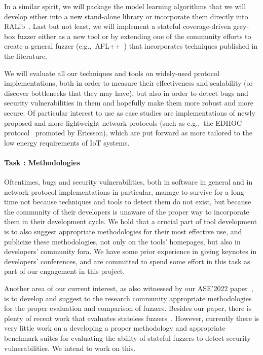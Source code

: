 \documentclass[11pt]{article}
\newcommand{\system}[1]{\mbox{\textsf{#1}}}
\newcounter{Task}
\newcommand{\task}[1]{\addtocounter{Task}{1}\paragraph{Task \theTask: #1}}
\newcommand{\significance}[1]{\vspace*{-0.5em}%
  \begin{quoting}\noindent\textbf{Significance:} #1\end{quoting}}
\newcommand{\myparagraph}{}
\let\myparagraph=\paragraph
\renewcommand{\paragraph}{\vspace{-3mm}\myparagraph}
\newcommand{\eg}{e.\/g.,\ }
\begin{document}
In a similar spirit, we will package the model learning algorithms that we
will develop either into a new stand-alone library or incorporate them
directly into \system{RALib}~\cite{CasselHJS16}.
%
Last but not least, we will implement a stateful coverage-driven grey-box
fuzzer either as a new tool or by extending one of the community efforts to
create a general fuzzer (\eg \system{AFL++}~\cite{AFL++@Woot-20}) that
incorporates techniques published in the literature.

We will evaluate all our techniques and tools on widely-used protocol
implementations, both in order to measure their effectiveness and scalability
(or discover bottlenecks that they may have), but also in order to detect bugs
and security vulnerabilities in them and hopefully make them more robust and
more secure. Of particular interest to use as case studies are implementations
of newly proposed and more lightweight network protocols (such as \eg the
EDHOC protocol~\cite{ietf-lake-edhoc-18} promoted by Ericsson), which are put
forward as more tailored to the low energy requirements of IoT systems.


\task{Methodologies}
Oftentimes, bugs and security vulnerabilities, both in software in general and
in network protocol implementations in particular, manage to survive for a
long time not because techniques and tools to detect them do not exist, but
because the community of their developers is unaware of the proper way to
incorporate them in their development cycle. We hold that a crucial part of
tool development is to also suggest appropriate methodologies for their most
effective use, and publicize these methodologies, not only on the tools'
homepages, but also in developers' community fora. We have some prior
experience in giving keynotes in developers' conferences, and are committed to
spend some effort in this task as part of our engagement in this project.

Another area of our current interest, as also witnessed by our ASE'2022
paper~\cite{SoManyFuzzers@ASE-22}, is to develop and suggest to the research
community appropriate methodologies for the proper evaluation and comparison
of fuzzers. Besides our paper, there is plenty of recent work that evaluates
stateless
fuzzers~\cite{EvaluatingFuzz@CCS-18,Magma@POMACS-20,UNIFUZZ@USENIX-21,FIXREVERTER@USENIX-22}.
However, currently there is very little work on a developing a proper
methodology and appropriate benchmark suites for evaluating the ability of
stateful fuzzers to detect security vulnerabilities. We intend to work on
this.
\end{document}
